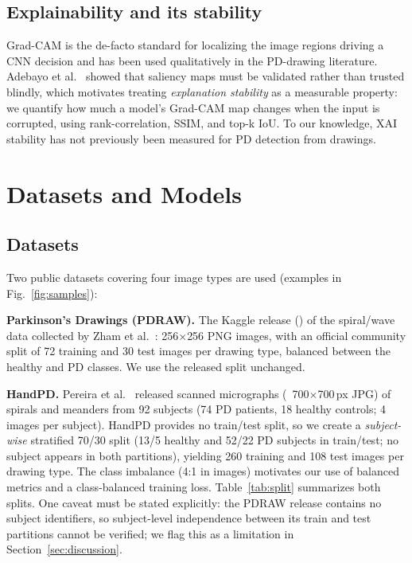 \documentclass[11pt,a4paper]{article}
\begin{document}
\subsection{Explainability and its stability}
Grad-CAM \cite{selvaraju2017} is the de-facto standard for localizing the
image regions driving a CNN decision and has been used qualitatively in the
PD-drawing literature. Adebayo et al.\ \cite{adebayo2018} showed that
saliency maps must be validated rather than trusted blindly, which motivates
treating \emph{explanation stability} as a measurable property: we quantify
how much a model's Grad-CAM map changes when the input is corrupted, using
rank-correlation, SSIM, and top-k IoU. To our knowledge, XAI stability has
not previously been measured for PD detection from drawings.

\section{Datasets and Models}
\label{sec:data}

\subsection{Datasets}
Two public datasets covering four image types are used (examples in
Fig.~\ref{fig:samples}):

\textbf{Parkinson's Drawings (PDRAW).} The Kaggle release
(\cite{kagglepdrawings}) of the spiral/wave data collected by Zham et al.\
\cite{zham2016,zham2017}: 256$\times$256 PNG images, with an official
community split of 72 training and 30 test images per drawing type, balanced
between the healthy and PD classes. We use the released split unchanged.

\textbf{HandPD.} Pereira et al.\ \cite{pereira2016} released scanned
micrographs (~700$\times$700\,px JPG) of spirals and meanders from 92
subjects (74 PD patients, 18 healthy controls; 4 images per subject). HandPD
provides no train/test split, so we create a \emph{subject-wise} stratified
70/30 split (13/5 healthy and 52/22 PD subjects in train/test;
no subject appears in both partitions), yielding 260 training and 108 test
images per drawing type. The class imbalance (4:1 in images) motivates our
use of balanced metrics and a class-balanced training loss.
Table~\ref{tab:split} summarizes both splits. One caveat must be stated
explicitly: the PDRAW release contains no subject identifiers, so
subject-level independence between its train and test partitions cannot be
verified; we flag this as a limitation in Section~\ref{sec:discussion}.
\end{document}

